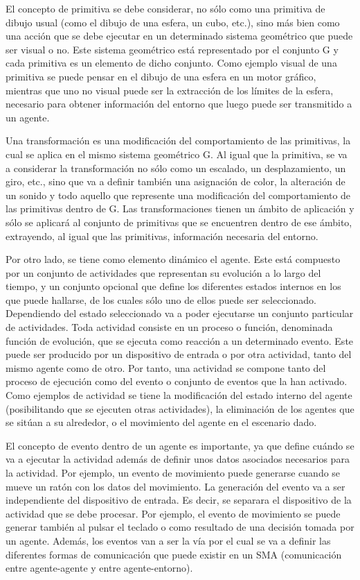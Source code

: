 \documentclass[runningheads]{llncs}
\begin{document}
El concepto de primitiva se debe considerar, no sólo como una primitiva de dibujo usual (como el dibujo de una esfera, un cubo, etc.), sino más bien como una acción que se debe ejecutar en un determinado sistema geométrico que puede ser visual o no. Este sistema geométrico está representado por el conjunto G y cada primitiva es un elemento de dicho conjunto. Como ejemplo visual de una primitiva se puede pensar en el dibujo de una esfera en un motor gráfico, mientras que uno no visual puede ser la extracción de los límites de la esfera, necesario para obtener información del entorno que luego puede ser transmitido a un agente.

Una transformación es una modificación del comportamiento de las primitivas, la cual se aplica en el mismo sistema geométrico G. Al igual que la primitiva, se va a considerar la transformación no sólo como un escalado, un desplazamiento, un giro, etc., sino que va a definir también una asignación de color, la alteración de un sonido y todo aquello que represente una modificación del comportamiento de las primitivas dentro de G. Las transformaciones tienen un ámbito de aplicación y sólo se aplicará al conjunto de primitivas que se encuentren dentro de ese ámbito, extrayendo, al igual que las primitivas, información necesaria del entorno.

Por otro lado, se tiene como elemento dinámico el agente. Este está compuesto por un conjunto de actividades que representan su evolución a lo largo del tiempo, y un conjunto opcional que define los diferentes estados internos en los que puede hallarse, de los cuales sólo uno de ellos puede ser seleccionado. Dependiendo del estado seleccionado va a poder ejecutarse un conjunto particular de actividades. Toda actividad consiste en un proceso o función, denominada función de evolución, que se ejecuta como reacción a un determinado evento. Este puede ser producido por un dispositivo de entrada o por otra actividad, tanto del mismo agente como de otro. Por tanto, una actividad se compone tanto del proceso de ejecución como del evento o conjunto de eventos que la han activado. Como ejemplos de actividad se tiene la modificación del estado interno del agente (posibilitando que se ejecuten otras actividades), la eliminación de los agentes que se sitúan a su alrededor, o el movimiento del agente en el escenario dado.

El concepto de evento dentro de un agente es importante, ya que define cuándo se va a ejecutar la actividad además de definir unos datos asociados necesarios para la actividad. Por ejemplo, un evento de movimiento puede generarse cuando se mueve un ratón con los datos del movimiento. La generación del evento va a ser independiente del dispositivo de entrada. Es decir, se separara el dispositivo de la actividad que se debe procesar. Por ejemplo, el evento de movimiento se puede generar también al pulsar el teclado o como resultado de una decisión tomada por un agente. Además, los eventos van a ser la vía por el cual se va a definir las diferentes formas de comunicación que puede existir en un SMA (comunicación entre agente-agente y entre agente-entorno).
\end{document}
